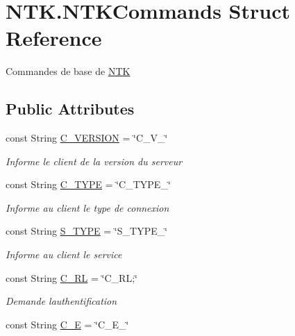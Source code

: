 \hypertarget{struct_n_t_k_1_1_n_t_k_commands}{}\section{N\+T\+K.\+N\+T\+K\+Commands Struct Reference}
\label{struct_n_t_k_1_1_n_t_k_commands}


Commandes de base de \mbox{\hyperlink{namespace_n_t_k}{N\+TK}}  


\subsection*{Public Attributes}
\begin{DoxyCompactItemize}
\item 
const String \mbox{\hyperlink{struct_n_t_k_1_1_n_t_k_commands_ab2bb92aaa4af7a574efd15970a422119}{C\+\_\+\+V\+E\+R\+S\+I\+ON}} = \char`\"{}C\+\_\+\+V\+\_\+\char`\"{}
\begin{DoxyCompactList}\small\item\em Informe le client de la version du serveur \end{DoxyCompactList}\item 
const String \mbox{\hyperlink{struct_n_t_k_1_1_n_t_k_commands_ab4aae6acfd570c7b4d8263e5d9b21f1a}{C\+\_\+\+T\+Y\+PE}} = \char`\"{}C\+\_\+\+T\+Y\+P\+E\+\_\+\char`\"{}
\begin{DoxyCompactList}\small\item\em Informe au client le type de connexion \end{DoxyCompactList}\item 
const String \mbox{\hyperlink{struct_n_t_k_1_1_n_t_k_commands_a1f6318b53c11d4507d9c9e509a5ad875}{S\+\_\+\+T\+Y\+PE}} = \char`\"{}S\+\_\+\+T\+Y\+P\+E\+\_\+\char`\"{}
\begin{DoxyCompactList}\small\item\em Informe au client le service \end{DoxyCompactList}\item 
const String \mbox{\hyperlink{struct_n_t_k_1_1_n_t_k_commands_a8096d82430bea3a0e9f116c9a46cbe5d}{C\+\_\+\+RL}} = \char`\"{}C\+\_\+\+RL;\char`\"{}
\begin{DoxyCompactList}\small\item\em Demande l\textquotesingle{}authentification \end{DoxyCompactList}\item 
const String \mbox{\hyperlink{struct_n_t_k_1_1_n_t_k_commands_afddbc3ecb4de8ef92dba66c6bd737192}{C\+\_\+E}} = \char`\"{}C\+\_\+\+E\+\_\+\char`\"{}

\end{DoxyCompactItemize}
